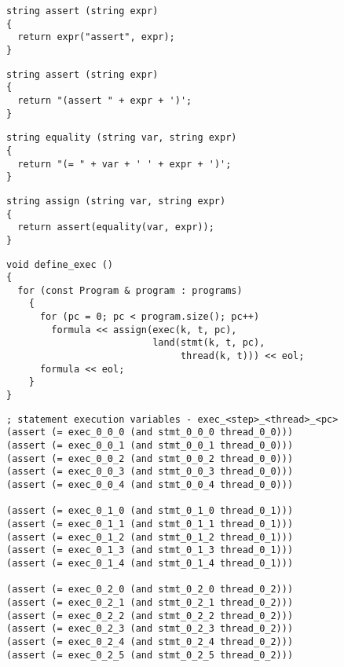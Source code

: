 \begin{lstlisting}[style=c++]
string assert (string expr)
{
  return expr("assert", expr);
}
\end{lstlisting}

\begin{lstlisting}[style=c++]
string assert (string expr)
{
  return "(assert " + expr + ')';
}
\end{lstlisting}

\begin{lstlisting}[style=c++]
string equality (string var, string expr)
{
  return "(= " + var + ' ' + expr + ')';
}
\end{lstlisting}

\begin{lstlisting}[style=c++]
string assign (string var, string expr)
{
  return assert(equality(var, expr));
}
\end{lstlisting}

\begin{lstlisting}[style=c++]
void define_exec ()
{
  for (const Program & program : programs)
    {
      for (pc = 0; pc < program.size(); pc++)
        formula << assign(exec(k, t, pc),
                          land(stmt(k, t, pc),
                               thread(k, t))) << eol;
      formula << eol;
    }
}
\end{lstlisting}

\begin{lstlisting}[language=SMTLib]
; statement execution variables - exec_<step>_<thread>_<pc>
(assert (= exec_0_0_0 (and stmt_0_0_0 thread_0_0)))
(assert (= exec_0_0_1 (and stmt_0_0_1 thread_0_0)))
(assert (= exec_0_0_2 (and stmt_0_0_2 thread_0_0)))
(assert (= exec_0_0_3 (and stmt_0_0_3 thread_0_0)))
(assert (= exec_0_0_4 (and stmt_0_0_4 thread_0_0)))

(assert (= exec_0_1_0 (and stmt_0_1_0 thread_0_1)))
(assert (= exec_0_1_1 (and stmt_0_1_1 thread_0_1)))
(assert (= exec_0_1_2 (and stmt_0_1_2 thread_0_1)))
(assert (= exec_0_1_3 (and stmt_0_1_3 thread_0_1)))
(assert (= exec_0_1_4 (and stmt_0_1_4 thread_0_1)))

(assert (= exec_0_2_0 (and stmt_0_2_0 thread_0_2)))
(assert (= exec_0_2_1 (and stmt_0_2_1 thread_0_2)))
(assert (= exec_0_2_2 (and stmt_0_2_2 thread_0_2)))
(assert (= exec_0_2_3 (and stmt_0_2_3 thread_0_2)))
(assert (= exec_0_2_4 (and stmt_0_2_4 thread_0_2)))
(assert (= exec_0_2_5 (and stmt_0_2_5 thread_0_2)))
\end{lstlisting}


